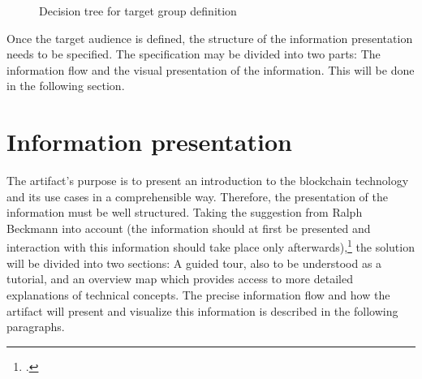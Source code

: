 \begin{figure}
    \centering
    
    \caption{Decision tree for target group definition}
    \label{fig:TargetGroup}
\end{figure}

Once the target audience is defined, the structure of the information presentation needs to be specified. The specification may be divided into two parts: The information flow and the visual presentation of the information. This will be done in the following section.

\section{Information presentation} \label{sec:InformationPresentation}
The artifact's purpose is to present an introduction to the blockchain technology and its use cases in a comprehensible way. Therefore, the presentation of the information must be well structured. Taking the suggestion from Ralph Beckmann into account (the information should at first be presented and interaction with this information should take place only afterwards),\footcite[Cf.][P115]{RalphBeckmann_Interview} the solution will be divided into two sections: A guided tour, also to be understood as a tutorial, and an overview map which provides access to more detailed explanations of technical concepts. The precise information flow and how the artifact will present and visualize this information is described in the following paragraphs.

